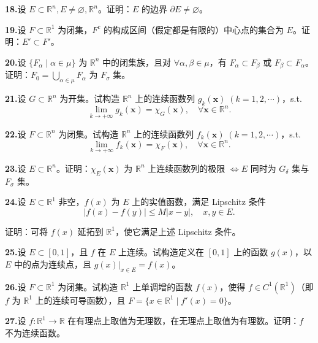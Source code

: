 \documentclass[11pt,a4paper]{article}
\begin{document}
\par{}\noindent\textbf{18.}\quad 设 $E\subset\mathbb R^n,E\ne\varnothing,\mathbb R^n$。证明：$E$ 的边界 $\partial E\ne\varnothing$。
\par{}\noindent\textbf{19.}\quad 设 $F\subset\mathbb R^1$ 为闭集，$F^c$ 的构成区间（假定都是有限的）中心点的集合为 $E$。证明：$E'\subset F'$。
\par{}\noindent\textbf{20.}\quad 设 $\{F_\alpha\mid\alpha\in\mu\}$ 为 $\mathbb R^n$ 中的闭集族，且对 $\forall\alpha,\beta\in\mu$，有 $F_\alpha\subset F_\beta$ 或 $F_\beta\subset F_\alpha$。证明：$F_0=\bigcup_{\alpha\in\mu}F_\alpha$ 为 $F_\sigma$ 集。
\par{}\noindent\textbf{21.}\quad 设 $G\subset\mathbb R^n$ 为开集。试构造 $\mathbb R^n$ 上的连续函数列 $g_k(\boldsymbol{x})\;(k=1,2,\cdots)$，s.t.
\[\lim_{k\to+\infty}g_k(\boldsymbol{x})=\chi_G(\boldsymbol{x}),\quad \forall\boldsymbol{x}\in\mathbb R^n.\]
\par{}\noindent\textbf{22.}\quad 设 $F\subset\mathbb R^n$ 为闭集。试构造 $\mathbb R^n$ 上的连续函数列 $f_k(\boldsymbol{x})\;(k=1,2,\cdots)$，s.t.
\[\lim_{k\to+\infty}f_k(\boldsymbol{x})=\chi_F(\boldsymbol{x}),\quad \forall\boldsymbol{x}\in\mathbb R^n.\]
\par{}\noindent\textbf{23.}\quad 设 $E\subset\mathbb R^n$。证明：$\chi_E(\boldsymbol{x})$ 为 $\mathbb R^n$ 上连续函数列的极限 $\Leftrightarrow E$ 同时为 $G_\delta$ 集与 $F_\sigma$ 集。
\par{}\noindent\textbf{24.}\quad 设 $E\subset\mathbb R^1$ 非空，$f(x)$ 为 $E$ 上的实值函数，满足 Lipschitz 条件
\[|f(x)-f(y)|\leq M|x-y|,\quad x,y\in E.\]
\par\noindent 证明：可将 $f(x)$ 延拓到 $\mathbb R^1$，使它满足上述 Lipschitz 条件。
\par{}\noindent\textbf{25.}\quad 设 $E\subset[0,1]$，且 $f$ 在 $E$ 上连续。试构造定义在 $[0,1]$ 上的函数 $g(x)$，以 $E$ 中的点为连续点，且 $g(x)|_{x\in E}=f(x)$。
\par{}\noindent\textbf{26.}\quad 设 $F\subset\mathbb R^1$ 为闭集。试构造 $\mathbb R^1$ 上单调增的函数 $f(x)$，使得 $f\in C^1(\mathbb R^1)$（即 $f$ 为 $\mathbb R^1$ 上的连续可导函数），且 $F=\{x\in\mathbb R^1\mid f'(x)=0\}$。
\par{}\noindent\textbf{27.}\quad 设 $f:\mathbb R^1\to\mathbb R$ 在有理点上取值为无理数，在无理点上取值为有理数。证明：$f$ 不为连续函数。
\end{document}
